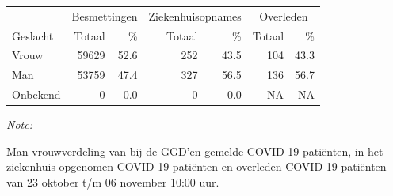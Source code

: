 \documentclass[
  english,
  man,floatsintext]{apa6}
\begin{document}
\begin{table}
\centering\begingroup\fontsize{11}{13}\selectfont

\begin{threeparttable}
\begin{tabular}{lrrrrrr}
\toprule
\multicolumn{1}{c}{ } & \multicolumn{2}{c}{Besmettingen} & \multicolumn{2}{c}{Ziekenhuisopnames} & \multicolumn{2}{c}{Overleden} \\
\cmidrule(l{3pt}r{3pt}){2-3} \cmidrule(l{3pt}r{3pt}){4-5} \cmidrule(l{3pt}r{3pt}){6-7}
Geslacht & Totaal & \% & Totaal & \% & Totaal & \%\\
\midrule
Vrouw & 59629 & 52.6 & 252 & 43.5 & 104 & 43.3\\
Man & 53759 & 47.4 & 327 & 56.5 & 136 & 56.7\\
Onbekend & 0 & 0.0 & 0 & 0.0 & NA & NA\\
\bottomrule
\end{tabular}
\begin{tablenotes}
\item \textit{Note: } 
\item Man-vrouwverdeling van bij de GGD’en gemelde COVID-19 patiënten, in het ziekenhuis opgenomen COVID-19 patiënten en overleden COVID-19 patiënten van 23 oktober t/m 06 november 10:00 uur.
\end{tablenotes}
\end{threeparttable}
\endgroup{}
\end{table}
\newpage
\end{document}
